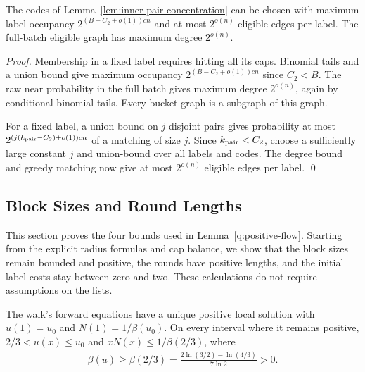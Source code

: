 \documentclass[runningheads,envcountsame,envcountsect,orivec]{llncs}
\begin{document}
\begin{lemma}
\label{lem:inner-label-occupancy}
The codes of Lemma~\ref{lem:inner-pair-concentration}
can be chosen with maximum label occupancy
$2^{(B-C_2+o(1))cn}$ and at most $2^{o(n)}$ eligible
edges per label. The full-batch eligible graph has maximum
degree $2^{o(n)}$.
\end{lemma}

\begin{proof}
Membership in a fixed label requires hitting all its caps.
Binomial tails and a union bound give maximum occupancy
$2^{(B-C_2+o(1))cn}$ since $C_2<B$.
The raw near probability in the full batch gives maximum
degree $2^{o(n)}$, again by conditional binomial tails.
Every bucket graph is a subgraph of this graph.

For a fixed label, a union bound on $j$ disjoint pairs
gives probability at most
$2^{(j(k_{\rm pair}-C_2)+o(1))cn}$ of a matching of
size $j$. Since $k_{\rm pair}<C_2$, choose a sufficiently
large constant $j$ and union-bound over all labels and
codes. The degree bound and greedy matching now give
at most $2^{o(n)}$ eligible edges per label.
\qed
\end{proof}

\subsection{Block Sizes and Round Lengths}
\label{app:q-schedule-details}

This section proves the four bounds used in
Lemma~\ref{q:positive-flow}. Starting from the explicit radius
formulas and cap balance, we show that the block sizes remain
bounded and positive, the rounds have positive lengths, and
the initial label costs stay between zero and two. These
calculations do not require assumptions on the lists.

\begin{lemma}
\label{lem:q-density-bound}
The walk's forward equations have a unique positive local
solution with $u(1)=u_0$ and $N(1)=1/\beta(u_0)$.
On every interval where it remains positive,
$2/3<u(x)\le u_0$ and $xN(x)\le1/\beta(2/3)$, where
\begin{align}
 \beta(u)\ge\beta(2/3)
 =\frac{2\ln(3/2)-\ln(4/3)}{7\ln 2}>0.
 \label{q:beta-min}
\end{align}
\end{lemma}
\end{document}
